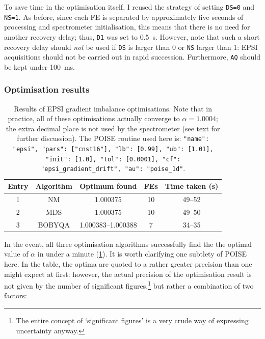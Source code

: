 To save time in the optimisation itself, I reused the strategy of setting \texttt{DS=0} and \texttt{NS=1}.
As before, since each FE is separated by approximately five seconds of processing and spectrometer initialisation, this means that there is no need for another recovery delay; thus, \texttt{D1} was set to \SI{0.5}{\s}.
However, note that such a short recovery delay should \textit{not} be used if \texttt{DS} is larger than 0 or \texttt{NS} larger than 1: EPSI acquisitions should not be carried out in rapid succession.
Furthermore, \texttt{AQ} should be kept under \SI{100}{\ms}.


\subsubsection{Optimisation results}

\begin{table}[htb]
    \centering
    \begin{tabular}{ccccc}
        \toprule
        Entry & Algorithm & Optimum found      & FEs & Time taken (\si{\s}) \\
        \midrule
        1     & NM        & 1.000375           & 10  & 49--52               \\
        2     & MDS       & 1.000375           & 10  & 49--50               \\
        3     & BOBYQA    & 1.000383--1.000388 & 7   & 34--35               \\
        \bottomrule
    \end{tabular}
    \caption{
        Results of EPSI gradient imbalance optimisations.
        Note that in practice, all of these optimisations actually converge to $\alpha = 1.0004$; the extra decimal place is not used by the spectrometer (see text for further discussion).
        The POISE routine used here is: \texttt{{"name": "epsi", "pars": ["cnst16"], "lb": [0.99], "ub": [1.01], "init": [1.0], "tol": [0.0001], "cf": "epsi_gradient_drift", "au": "poise_1d"}}.
    }
    \label{tbl:poise_epsi}
\end{table}

In the event, all three optimisation algorithms successfully find the the optimal value of $\alpha$ in under a minute (\cref{tbl:poise_epsi}).
It is worth clarifying one subtlety of POISE here.
In the table, the optima are quoted to a rather greater precision than one might expect at first: however, the actual precision of the optimisation result is not given by the number of significant figures,\footnote{The entire concept of `significant figures' is a very crude way of expressing uncertainty anyway.} but rather a combination of two factors:

